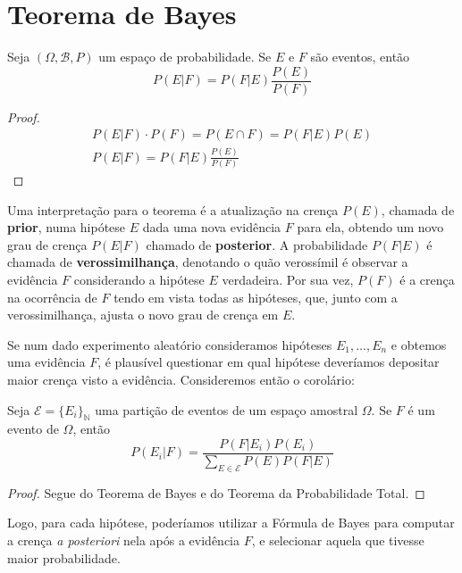 \section{Teorema de Bayes}
\begin{thm:bayes}
Seja $(\Omega, \mathcal{B}, P)$ um espaço de probabilidade.
Se $E$ e $F$ são eventos, então
\[
	P(E | F) = P(F | E) \frac{P(E)}{P(F)}
\]
\begin{proof}
	\begin{gather*}
		P(E | F) \cdot P(F) = P(E \cap F) = P(F | E) P(E)\\
		P(E | F) = P(F | E) \frac{P(E)}{P(F)}
	\end{gather*}
\end{proof}
\end{thm:bayes}

Uma interpretação para o teorema é a atualização na crença $P(E)$, chamada de
\textbf{prior}, numa hipótese $E$ dada uma nova evidência $F$ para ela, obtendo um novo
grau de crença $P(E|F)$ chamado de \textbf{posterior}. A probabilidade $P(F|E)$ é
chamada de \textbf{verossimilhança}, denotando o quão verossímil é observar a evidência $F$
considerando a hipótese $E$ verdadeira. Por sua vez, $P(F)$ é a crença na ocorrência
de $F$ tendo em vista todas as hipóteses, que, junto com a verossimilhança, ajusta
o novo grau de crença em $E$.

Se num dado experimento aleatório consideramos hipóteses $E_1, \ldots, E_n$ e obtemos
uma evidência $F$, é plausível questionar em qual hipótese deveríamos depositar maior
crença visto a evidência. Consideremos então o corolário:

\begin{cor:formula de bayes}
Seja $\mathcal{E} = \{E_i\}_\mathbb{N}$ uma partição de eventos de um espaço amostral
$\Omega$.
Se $F$ é um evento de $\Omega$, então
\[
	P(E_i | F) = \frac{P(F | E_i) P(E_i) }{\sum_{E \in \mathcal{E}} P(E) P(F | E)}
\]
\begin{proof}
	Segue do Teorema de Bayes e do Teorema da Probabilidade Total.
\end{proof}
\end{cor:formula de bayes}

Logo, para cada hipótese, poderíamos utilizar a Fórmula de Bayes para computar a crença
\textit{a posteriori} nela após a evidência $F$, e selecionar aquela que tivesse maior
probabilidade.
